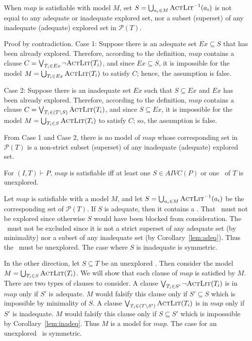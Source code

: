 \begin{lemma}
\label{lem:map:sound}
When $map$ is satisfiable with model $M$, set $S = \bigcup_{a_i \in M} \textsc{ActLit} ^{-1} (a_i)$ is not equal to any adequate or inadequate explored set, nor a subset (superset) of any
inadequate (adequate) explored set in $\mathcal{P}(T)$.
\end{lemma}
\begin{IEEEproof}
Proof by contradiction. Case 1: Suppose there is an adequate set $Ex \subseteq S$ that has been already explored. Therefore, according to the definition, $map$ contains a clause $C = \bigvee_{T_{i}\in Ex} \neg {\textsc{ActLit}(T_i)}$, and since $Ex \subseteq S$, it is impossible for the model $M = \bigcup_{T_i \in Ex} \textsc{ActLit} (T_i)$ to satisfy $C$; hence, the assumption is false.

Case 2: Suppose there is an inadequate set $Ex$ such that $S \subseteq Ex$ and $Ex$ has been already explored. Therefore, according to the definition, $map$ contains a clause $C = \bigvee_{T_{i}\in (T \setminus S)} \textsc{ActLit} (T_i)$, and since $S \subseteq Ex$, it is impossible for the model $M = \bigcup_{T_i \in S} \textsc{ActLit} (T_i)$ to satisfy $C$; so, the assumption is false.

From Case 1 and Case 2, there is no model of $map$ whose corresponding set in $\mathcal{P}(T)$ is a non-strict subset (superset) of any inadequate (adequate) explored set.
\end{IEEEproof}


\begin{lemma}
\label{lem:map:comp}
For $(I, T) \vdash P$, $map$ is satisfiable iff
at least one $S \in AIVC(P)$ or one \mis\ of $T$ is unexplored.
\end{lemma}
\begin{IEEEproof}
Let $map$ is satisfiable with a model $M$, and let $S = \bigcup_{a_i
  \in M} \textsc{ActLit} ^{-1} (a_i)$ be the corresponding set of
$\mathcal{P}(T)$. If $S$ is adequate, then it contains a \mivc. That
\mivc\ must not be explored since otherwise $S$ would have been blocked
from consideration. The \mivc\ must not be excluded since it is not a
strict superset of any adequate set (by minimality) nor a subset of
any inadequate set (by Corollary~\ref{lem:adeq}). Thus the \mivc\ must
be unexplored. The case where $S$ is inadequate is symmetric.

In the other direction, let $S \subseteq T$ be an unexplored \mivc.
Then consider the model $M = \bigcup_{T_i\in S} \textsc{ActLit}(T_i)$. We will
show that each clause of $map$ is satisfied by $M$. There are two
types of clauses to consider. A clause $\bigvee_{T_{i}\in S'} \neg
{\textsc{ActLit}(T_i)}$ is in $map$ only if $S'$ is adequate. $M$ would
falsify this clause only if $S' \subseteq S$ which is impossible by
minimality of $S$. A clause $\bigvee_{T_{i}\in (T \setminus S')}
\textsc{ActLit} (T_i)$ is in $map$ only if $S'$ is inadequate. $M$ would
falsify this clause only if $S \subseteq S'$ which is imposssible by
Corollary~\ref{lem:inadeq}. Thus $M$ is a model for $map$. The case
for an unexplored \mis\ is symmetric.
\end{IEEEproof}


